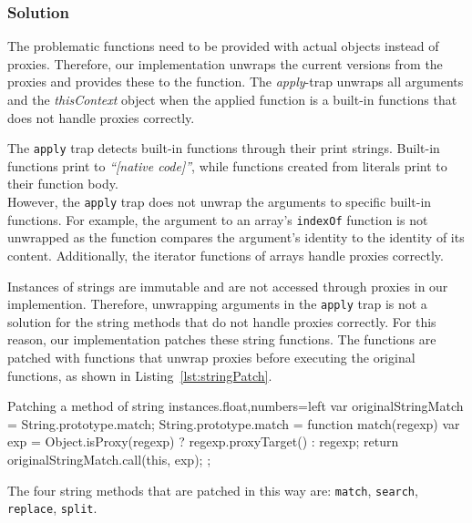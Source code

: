 \subsubsection{Solution}

The problematic functions need to be provided with actual objects instead of proxies.
Therefore, our implementation unwraps the current versions from the proxies and provides these to the function.
The \emph{apply}-trap unwraps all arguments and the \emph{thisContext} object when the applied function is a built-in functions that does not handle proxies correctly.

The \lstinline{apply} trap detects built-in functions through their print strings.
Built-in functions print to \emph{``[native code]''}, while functions created from literals print to their function body.\\
However, the \lstinline{apply} trap does not unwrap the arguments to specific built-in functions.
For example, the argument to an array's \lstinline{indexOf} function is not unwrapped as the function compares the argument's identity to the identity of its content.
Additionally, the iterator functions of arrays handle proxies correctly.

Instances of strings are immutable and are not accessed through proxies in our implemention.
Therefore, unwrapping arguments in the \lstinline{apply} trap is not a solution for the string methods that do not handle proxies correctly.
For this reason, our implementation patches these string functions.
The functions are patched with functions that unwrap proxies before executing the original functions, as shown in Listing~\ref{lst:stringPatch}.

\begin{code}{Patching a method of string instances.}{float,numbers=left}
var originalStringMatch = String.prototype.match;
String.prototype.match = function match(regexp) {
    var exp = Object.isProxy(regexp) ?
        regexp.proxyTarget() : regexp;
    return originalStringMatch.call(this, exp);
};
\end{code}
\iffalse
\end{verbatim}\fi

The four string methods that are patched in this way are: \lstinline{match}, \lstinline{search}, \lstinline{replace}, \lstinline{split}.

